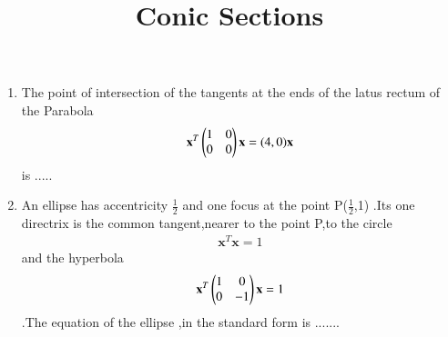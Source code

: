 \documentclass[journal,12pt,twocolumn]{IEEEtran}
\renewcommand\thesection{\arabic{section}}
\begin{document}
\let\StandardTheFigure\thefigure
\renewcommand{\thefigure}{\thesection}



\makeatletter
{}
\makeatother

\let\StandardTheFigure\thefigure
\let\StandardTheTable\thetable
\let\vec\mathbf





\def\putbox#1#2#3{\makebox[0in][l]{\makebox[#1][l]{}\raisebox{\baselineskip}[0in][0in]{\raisebox{#2}[0in][0in]{#3}}}}
     \def\rightbox#1{\makebox[0in][r]{#1}}
     \def\centbox#1{\makebox[0in]{#1}}
     \def\topbox#1{\raisebox{-\baselineskip}[0in][0in]{#1}}
     \def\midbox#1{\raisebox{-0.5\baselineskip}[0in][0in]{#1}}

\vspace{3cm}

\title{ 
Conic Sections
}



\maketitle


\bigskip

\renewcommand{\thefigure}{\theenumi}
\renewcommand{\thetable}{\theenumi}

\begin{enumerate}[label=\arabic*]
\item The point of intersection of the tangents at the ends of the latus rectum of the Parabola \begin{align} \vec x^T \myvec{1 & 0 \\ 0 & 0} \vec x=(4,0)\vec x \end{align} is .....
    
\item An ellipse has accentricity $\frac{1}{2}$ and one focus at the point P($\frac{1}{2}$,1) .Its one directrix is the common tangent,nearer to the point P,to the circle \begin{align}\vec x^T \vec x =1\end{align} and the hyperbola \begin{align}\vec x^T \myvec{1&0 \\0 &-1}\vec x=1\end{align}.The equation of the ellipse ,in the standard form is .......
\end{enumerate}
\end{document}
